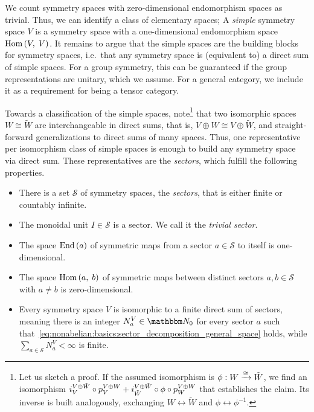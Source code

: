 We count symmetry spaces with zero-dimensional endomorphism spaces as trivial.
Thus, we can identify a class of elementary spaces;
%
A \emph{simple} symmetry space $V$ is a symmetry space with a one-dimensional endomorphism space $\mathrm{Hom}\left(V,\; V\right)$.
%
It remains to argue that the simple spaces are the building blocks for symmetry spaces, i.e.~that any symmetry space is (equivalent to) a direct sum of simple spaces.
%
For a group symmetry, this can be guaranteed if the group representations are unitary, which we assume.
%
For a general category, we include it as a requirement for being a tensor category.

Towards a classification of the simple spaces, note\footnote{
    Let us sketch a proof.
    If the assumed isomorphism is $\phi: W \xrightarrow{\cong} \tilde{W}$, we find an isomorphism $i^{V \oplus \tilde{W}}_V \circ p^{V \oplus W}_V + i^{V \oplus \tilde{W}}_{\tilde{W}} \circ \phi \circ p^{V \oplus W}_{W}$ that establishes the claim.
    Its inverse is built analogously, exchanging $W \leftrightarrow \tilde{W}$ and $\phi \leftrightarrow \phi^{-1}$.
} that two isomorphic spaces $W \cong \tilde W$ are interchangeable in direct sums, that is, $V \oplus W \cong V \oplus \tilde W$, and straight-forward generalizations to direct sums of many spaces.
%
Thus, one representative per isomorphism class of simple spaces is enough to build any symmetry space via direct sum.
%
These representatives are the \emph{sectors}, which fulfill the following properties.

\begin{itemize}
    \item There is a set $\mathcal{S}$ of symmetry spaces, the \emph{sectors}, that is either finite or countably infinite.
    \item The monoidal unit $I \in \mathcal{S}$ is a sector. We call it the \emph{trivial sector}.
    \item The space $\mathrm{End}\left(a\right)$ of symmetric maps from a sector $a \in \mathcal{S}$ to itself is one-dimensional.
    \item The space $\mathrm{Hom}\left(a,\; b\right)$ of symmetric maps between distinct sectors $a, b \in \mathcal{S}$ with $a \neq b$ is zero-dimensional.
    \item Every symmetry space $V$ is isomorphic to a finite direct sum of sectors, meaning there is an integer $N^V_a \in \Nbb_0$ for every sector $a$ such that~\eqref{eq:nonabelian:basics:sector_decomposition_general_space} holds, while $\sum_{a\in\mathcal{S}} N^{V}_a < \infty$ is finite.
\end{itemize}

